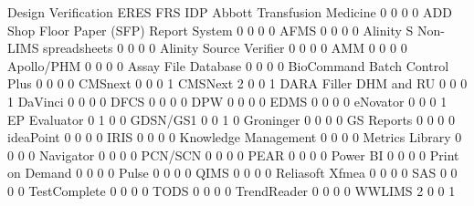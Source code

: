\documentclass{article}
\begin{document}
\begin{Schunk}
\begin{Soutput}
                                           Design Verification ERES FRS IDP
  Abbott Transfusion Medicine                                0    0   0   0
  ADD Shop Floor Paper (SFP) Report System                   0    0   0   0
  AFMS                                                       0    0   0   0
  Alinity S Non-LIMS spreadsheets                            0    0   0   0
  Alinity Source Verifier                                    0    0   0   0
  AMM                                                        0    0   0   0
  Apollo/PHM                                                 0    0   0   0
  Assay File Database                                        0    0   0   0
  BioCommand Batch Control Plus                              0    0   0   0
  CMSnext                                                    0    0   0   1
  CMSNext                                                    2    0   0   1
  DARA Filler DHM and RU                                     0    0   0   1
  DaVinci                                                    0    0   0   0
  DFCS                                                       0    0   0   0
  DPW                                                        0    0   0   0
  EDMS                                                       0    0   0   0
  eNovator                                                   0    0   0   1
  EP Evaluator                                               0    1   0   0
  GDSN/GS1                                                   0    0   1   0
  Groninger                                                  0    0   0   0
  GS Reports                                                 0    0   0   0
  ideaPoint                                                  0    0   0   0
  IRIS                                                       0    0   0   0
  Knowledge Management                                       0    0   0   0
  Metrics Library                                            0    0   0   0
  Navigator                                                  0    0   0   0
  PCN/SCN                                                    0    0   0   0
  PEAR                                                       0    0   0   0
  Power BI                                                   0    0   0   0
  Print on Demand                                            0    0   0   0
  Pulse                                                      0    0   0   0
  QIMS                                                       0    0   0   0
  Reliasoft Xfmea                                            0    0   0   0
  SAS                                                        0    0   0   0
  TestComplete                                               0    0   0   0
  TODS                                                       0    0   0   0
  TrendReader                                                0    0   0   0
  WWLIMS                                                     2    0   0   1


\end{Soutput}
\end{Schunk}
\end{document}
